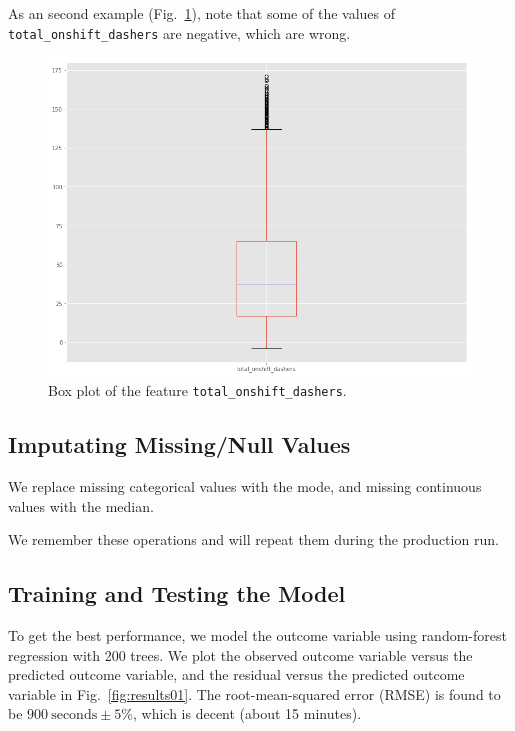 \documentclass[12pt]{article}
\begin{document}
As an second example (Fig.~\ref{fig:total_onshift_dashers}), note that some of the values of \texttt{total\_onshift\_dashers} are negative, which are wrong.

\begin{figure}[H]
\centering
\includegraphics[width=6in]{graphics/total_onshift_dashers.png}
\caption{Box plot of the feature \texttt{total\_onshift\_dashers}.}
\label{fig:total_onshift_dashers}
\end{figure}

\subsection{Imputating Missing/Null Values}

We replace missing categorical values with the mode, and missing continuous values with the median.

We remember these operations and will repeat them during the production run.

\subsection{Training and Testing the Model}
To get the best performance, we model the outcome variable using random-forest regression with 200 trees.
We plot the observed outcome variable versus the predicted outcome variable, and the residual versus the predicted outcome variable in Fig.~\ref{fig:results01}.  The root-mean-squared error (RMSE) is found to be $900~\text{seconds} \pm 5\%$, which is decent (about 15 minutes).
\end{document}
